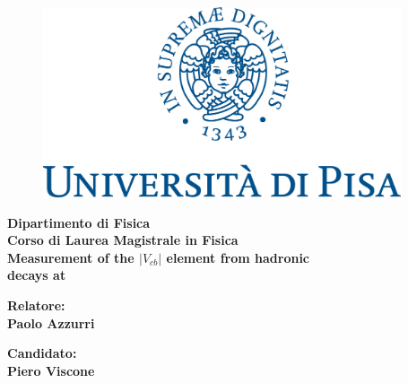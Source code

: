 \begin{titlepage} %
    \begin{figure}[h!] %
        \centering\includegraphics[width=0.94\textwidth]{fig/Frontespizio/marchio_unipi_pant541.png}
    \end{figure}
    
    \vspace{10mm}
    
    \begin{Large}
     \begin{center}
        \textbf{Dipartimento di Fisica\\ Corso di Laurea Magistrale in Fisica\\}
        \vspace{20mm}
        {    {\Huge{\textbf{Measurement of the $|V_{cb}|$ \CKM element from \PW hadronic \\ \vspace{3mm} decays at \CMS} }}}\\
    \end{center}
    \end{Large}
    
    
    \vspace{28mm}
    \begin{minipage}[t]{0.47\textwidth}
        {\large{\textbf {Relatore:\\ Paolo Azzurri}}}
    \end{minipage}
    \hfill
    \begin{minipage}[t]{0.47\textwidth}\raggedleft
        {\large{\textbf {Candidato:\\ Piero Viscone}}}
    \end{minipage}
    
    \vspace{28mm}
    
    \hrulefill
    
    \vspace{5mm}
    
    
    \end{titlepage}
 